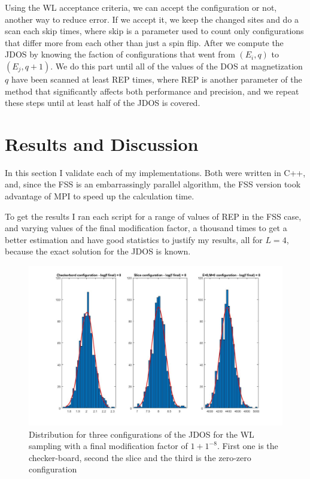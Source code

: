 \documentclass[a4paper, 11pt]{article}
\begin{document}
	Using the WL acceptance criteria, we can accept the configuration or not, another way to reduce error. If we accept it, we keep the changed sites and do a scan each skip times, where skip is a parameter used to count only configurations that differ more from each other than just a spin flip. After we compute the JDOS by knowing the faction of configurations that went from $(E_i, q)$ to $(E_j, q + 1)$. We do this part until all of the values of the DOS at magnetization $q$ have been scanned at least REP times, where REP is another parameter of the method that significantly affects both performance and precision, and we repeat these steps until at least half of the JDOS is covered.
	\newpage
	
	\section{Results and Discussion}
	
	In this section I validate each of my implementations. Both were written in C++, and, since the FSS is an embarrassingly parallel algorithm, the FSS version took advantage of MPI to speed up the calculation time.
	
	To get the results I ran each script for a range of values of REP in the FSS case, and varying values of the final modification factor, a thousand times to get a better estimation and have good statistics to justify my results, all for $L=4$, because the exact solution for the JDOS is known.
	
	\begin{figure}[h]
		\includegraphics[scale=0.27]{hist_f8_WL}
		\centering
		\caption{Distribution for three configurations of the JDOS for the WL sampling with a final modification factor of $1+1^{-8}$. First one is the checker-board, second the slice and the third is the zero-zero configuration}
	\end{figure}
	
\end{document}
